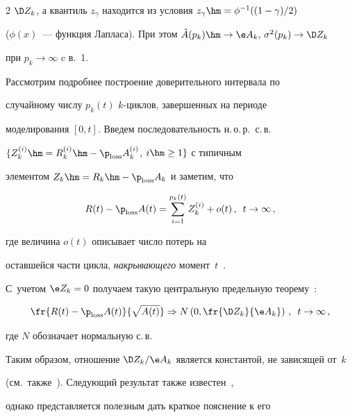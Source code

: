 \begin{multicols}{2}
$\D Z_k$, а квантиль $z_{\gamma}$ находится из условия $z_{\gamma}\hm=\phi ^{-1}((1-\gamma)/2)$ 


($\phi(x)$~--- функция Лапласа). При этом $\hat{A}(p_k)\hm\to \e A_k,\,\sigma^2(p_k)\to \D Z_k$ 


при $p_k\to \infty$ c в.~1.





Рассмотрим подробнее  построение доверительного интервала по


случайному числу $p_k(t)$ $k$-цик\-лов, завершенных на периоде


моделирования $[0,t]$. Введем последовательность н.\,о.\,р.\ с.\,в.\


$\{Z_k^{(i)}\hm=R_k^{(i)}\hm-\p_{\mathrm{loss}}A_k^{(i)}$, $i\hm\ge1 \}$ с типичным


элементом $Z_k\hm=R_k\hm-\p_{\mathrm{loss}}A_k$ и  заметим, что


\begin{equation} 


R(t)-\p_{\mathrm{loss}}A(t)=\sum\limits_{i=1}^{p_k(t)}Z_k^{(i)}+o(t)\,,\enskip t\to


\infty\,,


\label{e6-mn}


\end{equation} 


где величина  $o(t)$  описывает число потерь на


оставшейся части цикла, {\it накрывающего}  момент~$t$~\cite{Asmus, Smith}.


 С~учетом $\e Z_k=0$ получаем  такую центральную предельную теорему~\cite{Asmus}:


\begin{equation}


\fr{R(t)-\p_{\mathrm{loss}} A(t)}{\sqrt{A(t)}}\Rightarrow N


\left(0, \fr{\D Z_k}{\e A_k}\right)\,,\enskip


 t \to \infty\,, 


 \label{e7-mn}


\end{equation}


где $N$ обозначает нормальную с.\,в.


  Таким образом,   отношение $\D Z_k/\e A_k$ является константой, не зависящей от~$k$ 


  (см.\ также~\cite{Shedler}). Следующий результат также известен~\cite{Shedler},


однако представляется  полезным  дать краткое пояснение к его



\end{multicols}
